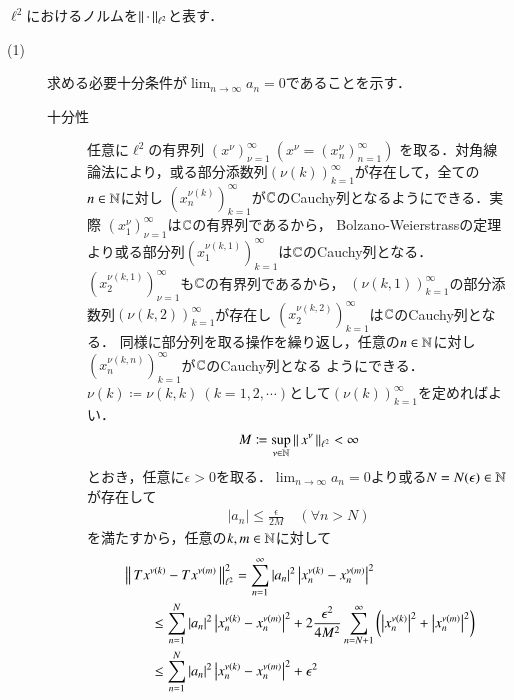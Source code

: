 	\begin{prf} $\ell^2$におけるノルムを$\left\|\, \cdot\, \right\|_{\ell^2}$と表す．
		\begin{description}
			\item[(1)] 求める必要十分条件が$\lim_{n \to \infty} a_n = 0$であることを示す．
				\begin{description}
					\item[十分性] 任意に$\ell^2$の有界列
						$\left( x^{\nu} \right)_{\nu=1}^{\infty}\ \left(x^{\nu} = \left( x^{\nu}_n \right)_{n=1}^{\infty} \right)$
						を取る．対角線論法により，或る部分添数列$(\nu(k))_{k=1}^{\infty}$が存在して，全ての$n \in \mathbb{N}$に対し
						$\left(x_n^{\nu(k)} \right)_{k=1}^{\infty}$が$\mathbb{C}$のCauchy列となるようにできる．実際
						$\left( x^{\nu}_1 \right)_{\nu=1}^{\infty}$は$\mathbb{C}$の有界列であるから，
						Bolzano-Weierstrassの定理より或る部分列$\left( x^{\nu(k,1)}_1 \right)_{k=1}^{\infty}$は$\mathbb{C}$のCauchy列となる．
						$\left( x^{\nu(k,1)}_2 \right)_{\nu=1}^{\infty}$も$\mathbb{C}$の有界列であるから，
						$(\nu(k,1))_{k=1}^{\infty}$の部分添数列$(\nu(k,2))_{k=1}^{\infty}$が存在し
						$\left( x^{\nu(k,2)}_2 \right)_{k=1}^{\infty}$は$\mathbb{C}$のCauchy列となる．
						同様に部分列を取る操作を繰り返し，任意の$n \in \mathbb{N}$に対し
						$\left( x^{\nu(k,n)}_n \right)_{k=1}^{\infty}$が$\mathbb{C}$のCauchy列となる
						ようにできる．$\nu(k) \coloneqq \nu(k,k)\ (k=1,2,\cdots)$として$(\nu(k))_{k=1}^{\infty}$を定めればよい．
						\begin{align}
							M \coloneqq \operatorname*{sup}_{\nu \in \mathbb{N}} \left\|\, x^\nu\, \right\|_{\ell^2} < \infty
						\end{align}
						とおき，任意に$\epsilon > 0$を取る．$\lim_{n \to \infty} a_n = 0$より或る$N = N(\epsilon) \in \mathbb{N}$が存在して
						\begin{align}
							|a_n| \leq \frac{\epsilon}{2 M} \quad (\forall n > N)
						\end{align}
						を満たすから，任意の$k,m \in \mathbb{N}$に対して
						\begin{align}
							&\left\|\, T x^{\nu(k)} - T x^{\nu(m)}\, \right\|_{\ell^2}^2
							= \sum_{n=1}^{\infty} |a_n|^2 \left|x_n^{\nu(k)} - x_n^{\nu(m)} \right|^2 \\
							&\qquad \leq \sum_{n=1}^{N} |a_n|^2 \left|x_n^{\nu(k)} - x_n^{\nu(m)} \right|^2 
								+ 2 \frac{\epsilon^2}{4 M^2} \sum_{n = N+1}^{\infty} \left( \left|x_n^{\nu(k)} \right|^2 + \left|x_n^{\nu(m)} \right|^2 \right) \\
							&\qquad \leq \sum_{n=1}^{N} |a_n|^2 \left|x_n^{\nu(k)} - x_n^{\nu(m)} \right|^2 + \epsilon^2
						\end{align}

\end{description}
\end{description}
\end{prf}
